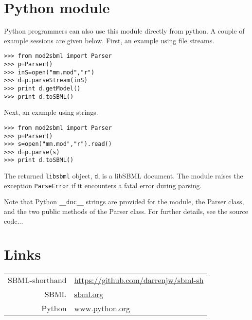 \documentclass[12pt,a4paper]{article}
\begin{document}
\section{Python module}

Python programmers can also use this module directly from python. A
couple of example sessions are given below.
First, an example using file streams.
\begin{verbatim}
>>> from mod2sbml import Parser
>>> p=Parser()
>>> inS=open("mm.mod","r")
>>> d=p.parseStream(inS)
>>> print d.getModel()
>>> print d.toSBML()
\end{verbatim}
Next, an example using strings.
\begin{verbatim}
>>> from mod2sbml import Parser
>>> p=Parser()
>>> s=open("mm.mod","r").read()
>>> d=p.parse(s)
>>> print d.toSBML()
\end{verbatim}
The returned \verb$libsbml$ object, \verb$d$, is a libSBML
document. The module raises the exception \texttt{ParseError} if it 
encounters a fatal error during parsing.

Note that Python \verb$__doc__$ strings are provided for the module, the Parser class, and the
two public methods of the Parser class. For further details, see the
source code...

\section{Links}

\begin{tabular}{rl}
SBML-shorthand & {\small
\href{https://github.com/darrenjw/sbml-sh}{\url{https://github.com/darrenjw/sbml-sh}}
}\\
SBML & \href{http://sbml.org/}{\url{sbml.org}} \\
Python & \href{http://www.python.org/}{\url{www.python.org}}
\end{tabular}
\end{document}
